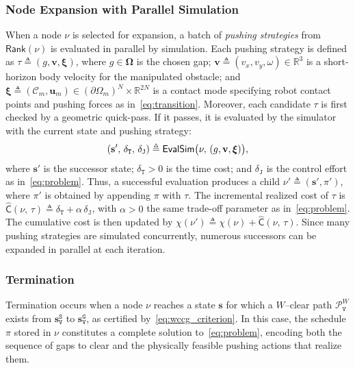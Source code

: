 \subsubsection{Node Expansion with Parallel Simulation}
When a node $\nu$ is selected for expansion, a batch of \emph{pushing
strategies} from $\mathsf{Rank}(\nu)$ is evaluated in parallel by simulation.
Each pushing strategy is defined as
\(\tau\triangleq(g,\mathbf{v},\boldsymbol{\xi})\), where
$g\in \boldsymbol{\Omega}$ is the chosen gap;
$\mathbf{v}\triangleq(v_x,v_y,\omega)\in \mathbb{R}^3$ is a short-horizon body
velocity for the manipulated obstacle;
and $\boldsymbol{\xi}\triangleq (\mathcal{C}_m,\mathbf{u}_m) \in (\partial\Omega_m)^N \times \mathbb{R}^{2N}$
is a contact mode specifying robot contact points and pushing forces as in~\eqref{eq:transition}.
Moreover, each candidate $\tau$ is first checked by a geometric quick-pass. If it passes,
it is evaluated by the simulator with the current state and pushing strategy:
\begin{equation}\label{eq:sim}
  (\mathbf{s}',\, \delta_\texttt{T},\, \delta_{\texttt{J}}) \triangleq \mathsf{EvalSim}
  \big{(}\nu,\, (g,\mathbf{v},\boldsymbol{\xi})\big{)},
\end{equation}
where $\mathbf{s}'$ is the successor state; $\delta_\texttt{T}>0$ is the time
cost; and $\delta_\texttt{J}$ is the control effort as in~\eqref{eq:problem}.
Thus, a successful evaluation produces a child
$\nu'\triangleq (\mathbf{s}',\pi')$, where $\pi'$ is obtained by appending
$\pi$ with $\tau$. The incremental realized cost of $\tau$ is
$\widehat{\mathsf{C}}(\nu,\,\tau)\triangleq \delta_\texttt{T} + \alpha\, \delta_\texttt{J}$,
with $\alpha>0$ the same trade-off parameter as in~\eqref{eq:problem}. The
cumulative cost is then updated by
$\chi(\nu')\triangleq \chi(\nu)+\widehat{\mathsf{C}}(\nu,\,\tau)$. Since many
pushing strategies are simulated concurrently, numerous successors can be
expanded in parallel at each iteration.

\subsubsection{Termination}
Termination occurs when a node $\nu$ reaches a state $\mathbf{s}$ for which a
$W$--clear path $\mathcal{P}^W_\texttt{V}$ exists from
$\mathbf{s}_\texttt{V}^{\texttt{S}}$ to $\mathbf{s}_\texttt{V}^{\texttt{G}}$,
as certified by~\eqref{eq:wccg_criterion}. In this case, the schedule $\pi$
stored in $\nu$ constitutes a complete solution to~\eqref{eq:problem}, encoding
both the sequence of gaps to clear and the physically feasible pushing actions
that realize them.

